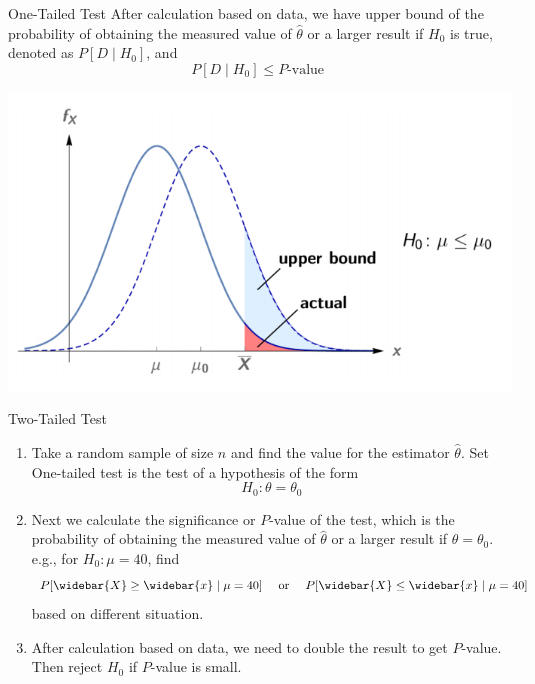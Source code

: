 \documentclass{beamer}
\begin{document}
\begin{frame}{One-Tailed Test}
After calculation based on data, we have upper bound of the probability of obtaining the measured value of $\widehat{\theta}$ or a larger result if $H_{0}$ is true, denoted as $P\left[D \mid H_{0}\right]$, and
$$
P\left[D \mid H_{0}\right] \leq P \text {-value }
$$
\begin{center}
\includegraphics[scale=0.5]{1.png}
\end{center}
\end{frame}

\begin{frame}{Two-Tailed Test}
\begin{enumerate}
\item Take a random sample of size $n$ and find the value for the estimator $\widehat{\theta}$. Set One-tailed test is the test of a hypothesis of the form
$$
H_{0}: \theta=\theta_{0}
$$
\item Next we calculate the significance or $P$-value of the test, which is the probability of obtaining the measured value of $\widehat{\theta}$ or a larger result if $\theta=\theta_{0}$. e.g., for $H_{0}: \mu=40$, find
$$
P[\widebar{X} \geq \widebar{x} \mid \mu=40] \quad \text { or } \quad P[\widebar{X} \leq \widebar{x} \mid \mu=40]
$$
based on different situation.
\item After calculation based on data, we need to double the result to get $P$-value. Then reject $H_{0}$ if $P$-value is small.
\end{enumerate}
\end{frame}
\end{document}
